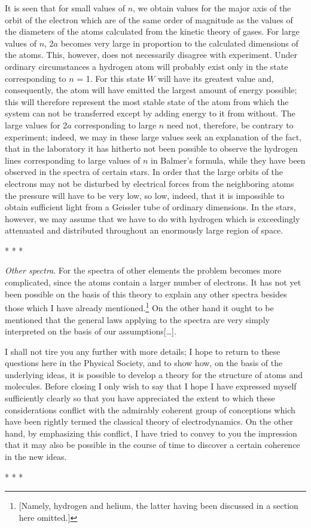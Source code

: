 It is seen that for small values of $n$, we obtain values for the
major axis of the orbit of the electron which are of the same order of
magnitude as the values of the diameters of the atoms calculated from
the kinetic theory of gases. For large values of $n$, 2$a$
becomes very large in proportion to the calculated dimensions of the
atoms. This, however, does not necessarily disagree with experiment.
Under ordinary circumstances a hydrogen atom will probably exist only in
the state corresponding to $n$ = 1. For this state $W$ will
have its greatest value and, consequently, the atom will have emitted
the largest amount of energy possible; this will therefore represent the
most stable state of the atom from which the system can not be
transferred except by adding energy to it from without. The large values
for 2$a$ corresponding to large $n$ need not, therefore, be
contrary to experiment; indeed, we may in these large values seek an
explanation of the fact, that in the laboratory it has hitherto not been
possible to observe the hydrogen lines corresponding to large values of
$n$ in Balmer's formula, while they have been observed in the
spectra of certain stars. In order that the large orbits of the
electrons may not be disturbed by electrical forces from the neighboring
atoms the pressure will have to be very low, so low, indeed, that it is
impossible to obtain sufficient light from a Geissler tube of ordinary
dimensions. In the stars, however, we may assume that we have to do with
hydrogen which is exceedingly attenuated and distributed throughout an
enormously large region of space.\\
\centerline{* * *}
%
\emph{Other spectra}. For the spectra of other elements the problem
becomes more complicated, since the atoms contain a larger number of
electrons. It has not yet been possible on the basis of this theory to
explain any other spectra besides those which I have already
mentioned.\footnote{{[}Namely, hydrogen and helium, the latter having
  been discussed in a section here omitted.{]}} On the other hand it
ought to be mentioned that the general laws applying to the spectra are
very simply interpreted on the basis of our assumptions[\ldots].

I shall not tire you any further with more details; I hope to return to
these questions here in the Physical Society, and to show how, on the
basis of the underlying ideas, it is possible to develop a theory for
the structure of atoms and molecules. Before closing I only wish to say
that I hope I have expressed myself sufficiently clearly so that you
have appreciated the extent to which these considerations conflict with
the admirably coherent group of conceptions which have been rightly
termed the classical theory of electrodynamics. On the other hand, by
emphasizing this conflict, I have tried to convey to you the impression
that it may also be possible in the course of time to discover a certain
coherence in the new ideas.\\
\centerline{* * *}
%
